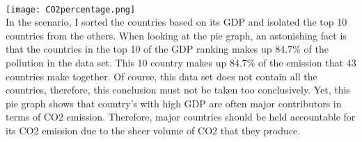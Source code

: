 \documentclass[fontsize=11pt]{article}
\begin{document}
\\
\texttt{[image: CO2percentage.png]}
\\
In the scenario, I sorted the countries based on its GDP and isolated the top 10 countries from the others. When looking at the pie graph, an astonishing fact is that the countries in the top 10 of the GDP ranking makes up 84.7\% of the pollution in the data set. This 10 country makes up 84.7\% of the emission that 43 countries make together. Of course, this data set does not contain all the countries, therefore, this conclusion must not be taken too conclusively. Yet, this pie graph shows that country's with high GDP are often major contributors in terms of CO2 emission. Therefore, major countries should be held accountable for its CO2 emission due to the sheer volume of CO2 that they produce.
\end{document}
